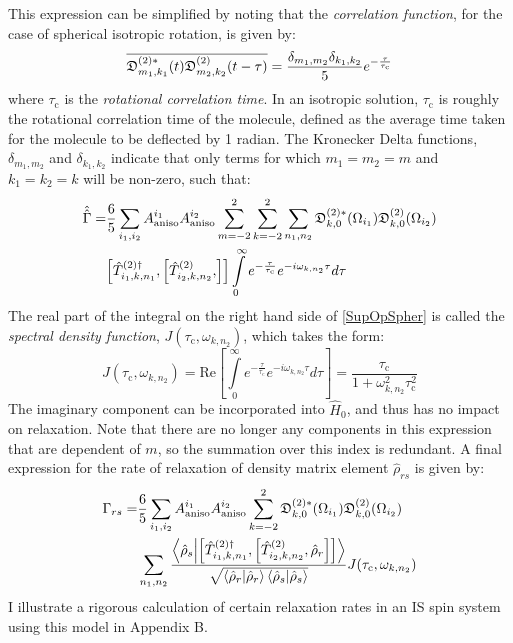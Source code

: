 This expression can be simplified by noting that the \textit{correlation function}, for the case of spherical isotropic rotation, is given by\cite{RN40}:
\begin{equation}\\
\label{CorrFuncSpher}
\overline{\mathfrak{D}_{m_1,k_1}^{(2)*}(t) \mathfrak{D}_{m_2,k_2}^{(2)} (t - \tau)} = \frac{\delta_{m_1,m_2} \delta_{k_1,k_2}}{5} e^{-\frac{\tau}{\tau_{\text{c}}}}
\end{equation}
where $\tau_{\text{c}}$ is the \textit{rotational correlation time}. In an isotropic solution, $\tau_{\text{c}}$ is roughly the rotational correlation time of the molecule, defined as the average time taken for the molecule to be deflected by 1 radian\cite{RN2}. The Kronecker Delta functions, $\delta_{m_1,m_2}$ and $\delta_{k_1,k_2}$ indicate that only terms for which $m_1 = m_2 = m$ and $k_1 = k_2 = k$ will be non-zero, such that:
\begin{equation}
\label{SupOpSpher}
\begin{split}
\hat{\hat{\Gamma}} = &\frac{6}{5} \sum \limits_{i_1, i_2} A_{\text{aniso}}^{i_1} A_{\text{aniso}}^{i_{2}} \sum \limits_{m = -2}^2 \sum \limits_{k = -2}^2 \sum \limits_{n_1, n_2} \mathfrak{D}_{k,0}^{(2)*} (\Omega_{i_1}) \mathfrak{D}_{k,0}^{(2)} (\Omega_{i_2})\\
& \comm{\hat{T}_{i_1, k, n_1}^{(2) \dagger}}{\comm{\hat{T}_{i_2, k, n_2}^{(2)}}{}} \int \limits_0^{\infty} e^{-\frac{\tau}{\tau_{\text{c}}}} e^{-i \omega_{k, n_2} \tau} d \tau
\end{split}
\end{equation}
The real part of the integral on the right hand side of \ref{SupOpSpher} is called the \textit{spectral density function}, $J(\tau_{\text{c}}, \omega_{k,n_2})$, which takes the form:
\begin{equation}
\label{SpecDenSpher}
J(\tau_{\text{c}}, \omega_{k,n_2}) = \text{Re} \left[\int \limits_0^{\infty} e^{-\frac{\tau}{\tau_{\text{c}}}} e^{-i \omega_{k, n_2} \tau} d \tau \right]= \frac{\tau_{\text{c}}}{1 + \omega_{k,n_2}^2 \tau_{\text{c}}^2}
\end{equation}
The imaginary component can be incorporated into $\hat{H}_0$, and thus has no impact on relaxation\cite{RN2}. 
Note that there are no longer any components in this expression that are dependent of $m$, so the summation over this index is redundant. A final expression for the rate of relaxation of density matrix element $\hat{\rho}_{rs}$ is given by:
\begin{equation}
\begin{split}
\label{SpherOpElement}
\Gamma_{rs} =&\frac{6}{5} \sum \limits_{i_1, i_2} A_{\text{aniso}}^{i_1} A_{\text{aniso}}^{i_2} \sum \limits_{k = -2}^2 \mathfrak{D}_{k,0}^{(2)*} (\Omega_{i_1}) \mathfrak{D}_{k,0}^{(2)} (\Omega_{i_2})\\
&\sum \limits_{n_1, n_2} \frac{\bra{\hat{\rho}_s} \ket{\comm{\hat{T}_{i_1, k, n_1}^{(2) \dagger}}{\comm{\hat{T}_{i_2,k,n_2}^{(2)}}{\hat{\rho}_r}}}}{\sqrt{\bra{\hat{\rho}_r} \ket{\hat{\rho}_r} \bra{\hat{\rho}_s} \ket{\hat{\rho}_s}}} J(\tau_{\text{c}}, \omega_{k,n_2})
\end{split}
\end{equation}
I illustrate a rigorous calculation of certain relaxation rates in an IS spin system using this model in Appendix B.
